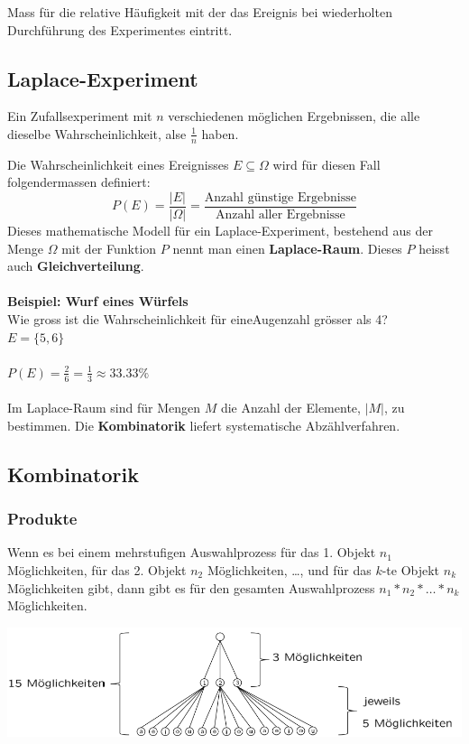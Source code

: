 \documentclass[10pt]{article}
\newtheorem[M]{definition}{Def.}
\newtheorem[M]{satz}{Satz}
\numberwithin{equation}{section}
\begin{document}
\begin{definition}[Wahrscheinlichkeit]
Mass für die relative Häufigkeit mit der das Ereignis bei wiederholten Durchführung des Experimentes eintritt.
\end{definition}

\subsection{Laplace-Experiment}
\begin{definition}
Ein Zufallsexperiment mit $n$ verschiedenen möglichen Ergebnissen, die alle dieselbe Wahrscheinlichkeit, alse $\frac{1}{n}$ haben.
\end{definition}

Die Wahrscheinlichkeit eines Ereignisses $E \subseteq\Omega$ wird für diesen Fall folgendermassen definiert:
\begin{equation}
  P(E)=\frac{|E|}{|\Omega|}=\frac{\text{Anzahl günstige Ergebnisse}}{\text{Anzahl aller Ergebnisse}}
\end{equation}
Dieses mathematische Modell für ein Laplace-Experiment, bestehend aus der Menge $\Omega$ mit der Funktion $P$ nennt man einen \textbf{Laplace-Raum}. Dieses $P$ heisst auch \textbf{Gleichverteilung}. \\
\\
\textbf{Beispiel:  Wurf eines Würfels} \\
Wie gross ist die Wahrscheinlichkeit für eineAugenzahl grösser als 4? \\
$E=\{5,6\}$ \\
\\
$P(E)=\frac{2}{6}=\frac{1}{3} \approx 33.33\%$ \\
\\
Im Laplace-Raum sind für Mengen $M$ die Anzahl der Elemente, $|M|$, zu bestimmen. Die \textbf{Kombinatorik} liefert systematische Abzählverfahren.

\subsection{Kombinatorik}

\subsubsection{Produkte}
\begin{definition}[Produktregel]
Wenn es bei einem mehrstufigen Auswahlprozess für das 1. Objekt $n_1$ Möglichkeiten, für das 2. Objekt $n_2$ Möglichkeiten, \dots , und für das $k$-te Objekt $n_k$ Möglichkeiten gibt, dann gibt es für den gesamten Auswahlprozess $n_1*n_2* \dots * n_k$ Möglichkeiten.
\end{definition}
\begin{center}
	\includegraphics[scale=0.4]{produktregel.png}
\end{center}
\end{document}
